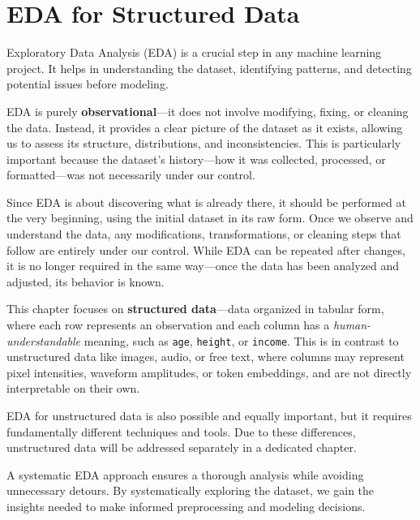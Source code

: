 \documentclass[12pt,openany]{book}
\begin{document}
\chapter{EDA for Structured Data}

Exploratory Data Analysis (EDA) is a crucial step in any machine learning 
project. It helps in understanding the dataset, identifying patterns, and 
detecting potential issues before modeling. \newline

EDA is purely \textbf{observational}—it does not involve modifying, fixing, 
or cleaning the data. Instead, it provides a clear picture of the dataset 
as it exists, allowing us to assess its structure, distributions, and 
inconsistencies. This is particularly important because the dataset’s 
history—how it was collected, processed, or formatted—was not necessarily 
under our control. \newline

Since EDA is about discovering what is already there, it should be performed 
at the very beginning, using the initial dataset in its raw form. Once we 
observe and understand the data, any modifications, transformations, or 
cleaning steps that follow are entirely under our control. While EDA can be 
repeated after changes, it is no longer required in the same way—once the 
data has been analyzed and adjusted, its behavior is known. \newline

This chapter focuses on \textbf{structured data}—data organized in tabular 
form, where each row represents an observation and each column has a 
\textit{human-understandable} meaning, such as \texttt{age}, \texttt{height}, 
or \texttt{income}. This is in contrast to unstructured data like images, 
audio, or free text, where columns may represent pixel intensities, 
waveform amplitudes, or token embeddings, and are not directly interpretable 
on their own. \newline

EDA for unstructured data is also possible and equally important, but it 
requires fundamentally different techniques and tools. Due to these 
differences, unstructured data will be addressed separately in a dedicated 
chapter. \newline

A systematic EDA approach ensures a thorough analysis while avoiding 
unnecessary detours. By systematically exploring the dataset, we gain the 
insights needed to make informed preprocessing and modeling decisions.
\newline
\end{document}
